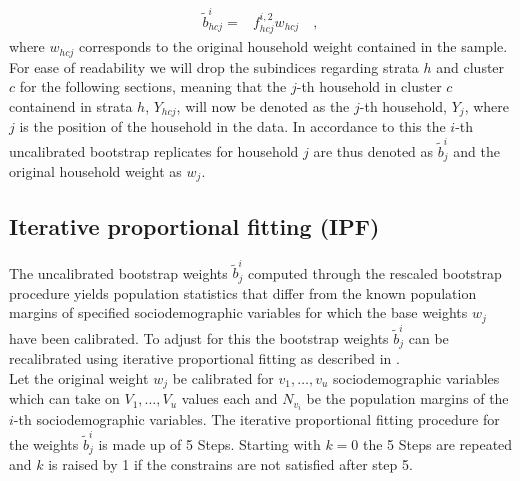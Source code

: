 \documentclass{scrartcl}
\begin{document}
\begin{align*}
  \tilde{b}_{hcj}^{i} =& f^{i,2}_{hcj} w_{hcj} \quad,
\end{align*}
where $w_{hcj}$ corresponds to the original household weight contained in the sample.\\

For ease of readability we will drop the subindices regarding strata $h$ and cluster $c$ for the following sections, meaning that the $j$-th household in cluster $c$ containend in strata $h$, $Y_{hcj}$, will now be denoted as the $j$-th household, $Y_{j}$, where $j$ is the position of the household in the data. In accordance to this the $i$-th uncalibrated bootstrap replicates for household $j$ are thus denoted as $\tilde{b}_j^{i}$ and the original household weight as $w_j$.


\subsection{Iterative proportional fitting (IPF)}
The uncalibrated bootstrap weights $\tilde{b}_j^{i}$ computed through the rescaled bootstrap procedure yields population statistics that differ from the known population margins of specified sociodemographic variables for which the base weights $w_j$ have been calibrated. To adjust for this the bootstrap weights $\tilde{b}_{j}^{i}$ can be recalibrated using iterative proportional fitting as described in \citep{mekogu2016}.\\

Let the original weight $w_{j}$ be calibrated for $v_1,\ldots,v_u$ sociodemographic variables which can take on $V_1,\ldots,V_u$ values each and $N_{v_i}$ be the population margins of the $i$-th sociodemographic variables. The iterative proportional fitting procedure for the weights $\tilde{b}_j^{i}$ is made up of 5 Steps. Starting with $k=0$ the 5 Steps are repeated and $k$ is raised by 1 if the constrains are not satisfied after step 5.
\end{document}

